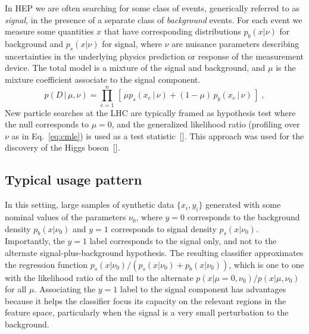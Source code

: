 \documentclass[aoas,preprint]{imsart}
\newcommand{\citek}[1]{[\cite{#1}]}
\numberwithin{equation}{section}
\theoremstyle{plain}
\begin{document}
In HEP we are often searching for some 
class of events, generically referred to as \textit{signal}, in the presence of a separate class 
of \textit{background} events.  For each event we measure some quantities $x$ that have corresponding distributions 
$p_b(x|\nu)$ for background and $p_s(x|\nu)$ for signal, where $\nu$ are nuisance parameters describing 
uncertainties in the underlying physics prediction or response of the measurement device. The 
total model is a mixture of the signal and background, and $\mu$ is the mixture coefficient associate 
to the signal component. 
\begin{equation}\label{eq:hepGen}
p( D \,|\, \mu, \nu) = \prod_{e=1}^n \, \left[\, \mu p_s( x_e \, |\,  \nu)  + (1-\mu)\, p_b( x_e \,|\, \nu) \,\right] \; ,
\end{equation}
New particle searches at the LHC are typically framed as hypothesis test where the null corresponds to $\mu=0$, and the
generalized likelihood ratio (profiling over $\nu$ as in Eq.~\ref{eq:cmle}) is used as a test statistic~\citek{Cowan:2010js}. This approach was used for the discovery of the Higgs boson~\citek{Aad:2012tfa,Chatrchyan:2012ufa}.


\subsection{Typical usage pattern}

In this setting, large samples of synthetic data $\{x_i, y_i\}$ generated with some nominal values of the parameters $\nu_0$, where $y=0$ corresponds to the background density $p_b(x|\nu_0)$  and $y=1$ corresponds to signal density $p_s(x|\nu_0)$. Importantly, the $y=1$ label corresponds to the signal only, and not to the alternate signal-plus-background hypothesis. The resulting classifier approximates the regression function $p_s(x|\nu_0)/(p_s(x|\nu_0)+p_b(x|\nu_0))$, which is one to one with the likelihood ratio of the null to the alternate $p(x|\mu=0,\nu_0)/p(x|\mu,\nu_0)$ for all $\mu$. Associating the $y=1$ label to the signal component has advantages because it helps the classifier focus its capacity on the relevant regions in the feature space, particularly when the signal is a very small perturbation to the background. 
\end{document}
